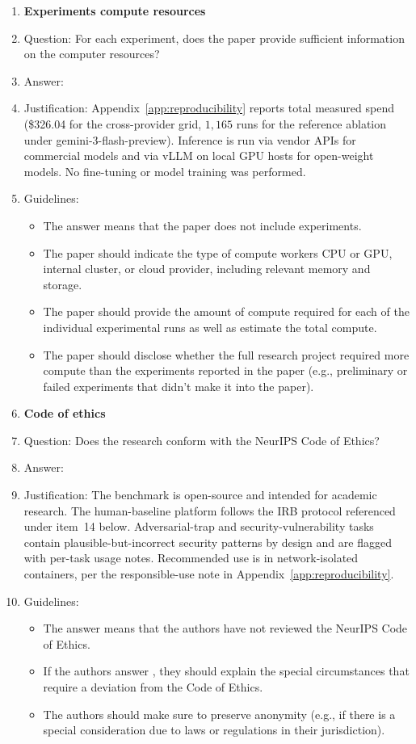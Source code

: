 \begin{enumerate}
\item {\bf Experiments compute resources}
    \item[] Question: For each experiment, does the paper provide sufficient information on the computer resources?
    \item[] Answer: \answerYes{}
    \item[] Justification: Appendix~\ref{app:reproducibility} reports total measured spend (\$326.04 for the cross-provider grid, $1{,}165$ runs for the reference ablation under gemini-3-flash-preview). Inference is run via vendor APIs for commercial models and via vLLM on local GPU hosts for open-weight models. No fine-tuning or model training was performed.
    \item[] Guidelines:
    \begin{itemize}
        \item The answer \answerNA{} means that the paper does not include experiments.
        \item The paper should indicate the type of compute workers CPU or GPU, internal cluster, or cloud provider, including relevant memory and storage.
        \item The paper should provide the amount of compute required for each of the individual experimental runs as well as estimate the total compute. 
        \item The paper should disclose whether the full research project required more compute than the experiments reported in the paper (e.g., preliminary or failed experiments that didn't make it into the paper). 
    \end{itemize}

\item {\bf Code of ethics}
    \item[] Question: Does the research conform with the NeurIPS Code of Ethics?
    \item[] Answer: \answerYes{}
    \item[] Justification: The benchmark is open-source and intended for academic research. The human-baseline platform follows the IRB protocol referenced under item~14 below. Adversarial-trap and security-vulnerability tasks contain plausible-but-incorrect security patterns by design and are flagged with per-task usage notes. Recommended use is in network-isolated containers, per the responsible-use note in Appendix~\ref{app:reproducibility}.
    \item[] Guidelines:
    \begin{itemize}
        \item The answer \answerNA{} means that the authors have not reviewed the NeurIPS Code of Ethics.
        \item If the authors answer \answerNo, they should explain the special circumstances that require a deviation from the Code of Ethics.
        \item The authors should make sure to preserve anonymity (e.g., if there is a special consideration due to laws or regulations in their jurisdiction).
    \end{itemize}


\end{enumerate}
